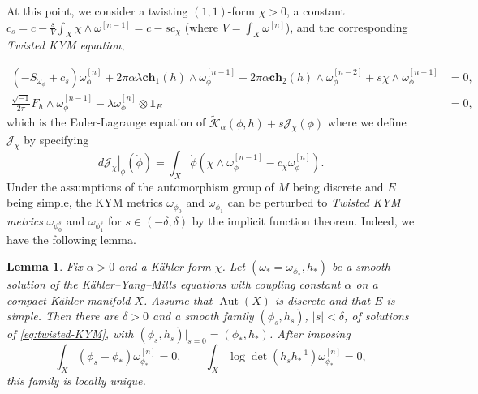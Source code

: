\documentclass[10pt, letterpaper]{amsart}
\theoremstyle{plain}
\newtheorem{lemma}[theorem]{Lemma}
\theoremstyle{definition}
\numberwithin{equation}{section}
\begin{document}
At this point, we consider a twisting $(1,1)$-form $\chi>0$, a constant $c_s=c-\frac{s}{V}\int_X\chi\wedge\omega^{[n-1]}=c-sc_\chi$ (where $V=\int_X \omega^{[n]}$), and the corresponding \emph{Twisted KYM equation}, 

\begin{align}
\left( -S_{\omega_\phi}+c_s\right)\omega_\phi^{[n]} 
+ 
2\pi\alpha\lambda \mathbf{ch}_1\left(h\right) \wedge \omega_\phi^{[n-1]} 
- 2\pi\alpha  \mathbf{ch}_2\left(h\right)\wedge \omega_\phi^{[n-2]}
+ 
s \chi\wedge  \omega_\phi^{[n-1]} 
& =
0, \nonumber \\
\frac{\sqrt{-1}}{2\pi}F_{h}\wedge \omega_\phi^{[n-1]}-\lambda \omega_\phi^{[n]}\otimes \mathbf{1}_E
& = 
0,
\label{eq:twisted-KYM}
\end{align}
which is the Euler-Lagrange equation of $\widetilde{\mathcal{K}}_\alpha\left(\phi,h\right)+s\mathcal{J}_\chi\left(\phi\right)$ where we define
$\mathcal J_\chi$ by specifying
\begin{equation}\label{eq:normalized-J-functional}
\left.d\mathcal J_\chi\right|_\phi(\dot\phi)
=
\int_X\dot\phi\left(
\chi\wedge\omega_\phi^{[n-1]}
-c_\chi\omega_\phi^{[n]}
\right).
\end{equation}
Under the assumptions of the automorphism group of $M$ being discrete and $E$ being simple, the KYM metrics $\omega_{\phi_0}$ and $\omega_{\phi_1}$ can be perturbed to \emph{Twisted KYM metrics} $\omega_{\phi_0^s}$ and $\omega_{\phi_1^s}$ for $s\in \left(-\delta,\delta\right)$ by the implicit function theorem.  Indeed, we have the following lemma.
\begin{lemma}
\label{lem:perturbation}
Fix $\alpha>0$ and a K\"ahler form $\chi$.  Let
$(\omega_*=\omega_{\phi_*},h_*)$ be a smooth solution of the
K\"ahler--Yang--Mills equations with coupling constant $\alpha$ on a
compact K\"ahler manifold $X$.
Assume that $\operatorname{Aut}(X)$ is discrete and that $E$ is simple.
Then there are $\delta>0$ and a smooth family
$(\phi_s,h_s)$, $|s|<\delta$, of solutions of
\eqref{eq:twisted-KYM}, with $(\phi_s,h_s)|_{s=0}=(\phi_*,h_*)$.
After imposing
\begin{equation}\label{eq:twisted-family-normalization}
\int_X(\phi_s-\phi_*)\omega_{\phi_*}^{[n]}=0,
\qquad
\int_X\log\det(h_sh_*^{-1})\omega_{\phi_*}^{[n]}=0,
\end{equation}
this family is locally unique.
\end{lemma}
\end{document}
